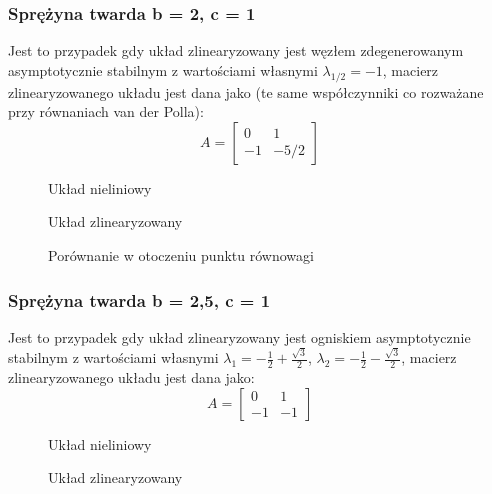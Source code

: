 \documentclass[a4paper, 10pt]{article}
\begin{document}
			\subsubsection{Sprężyna twarda b = 2, c = 1}
				Jest to przypadek gdy układ zlinearyzowany jest węzłem zdegenerowanym asymptotycznie stabilnym z wartościami własnymi $\lambda_{1/2} =-1$, macierz zlinearyzowanego układu jest dana jako (te same współczynniki co rozważane przy równaniach van der Polla):
				$$
				A = \begin{bmatrix}
				0 & 1 \\
				-1  & -5/2
				\end{bmatrix}
				$$
				\begin{figure}[H]
					\centering
					\def \svgwidth{0.8\columnwidth}
					
					\caption{Układ nieliniowy}
				\end{figure}\noindent
				
				
				\begin{figure}[H]
					\centering
					\def \svgwidth{0.8\columnwidth}
					
					\caption{Układ zlinearyzowany}
				\end{figure}\noindent
				
				
				\begin{figure}[H]
					\centering
					\def \svgwidth{0.8\columnwidth}
					
					\caption{Porównanie w otoczeniu punktu równowagi}
				\end{figure}\noindent
				
			\subsubsection{Sprężyna twarda b = 2,5, c = 1}
				Jest to przypadek gdy układ zlinearyzowany jest ogniskiem asymptotycznie stabilnym z wartościami własnymi $\lambda_1 = -\frac{1}{2} + \frac{\sqrt{3}}{2}$, $\lambda_2 = -\frac{1}{2} - \frac{\sqrt{3}}{2}$, macierz zlinearyzowanego układu jest dana jako:
				$$
				A = \begin{bmatrix}
				0 & 1 \\
				-1  & -1
				\end{bmatrix}
				$$
				\begin{figure}[H]
					\centering
					\def \svgwidth{0.8\columnwidth}
					
					\caption{Układ nieliniowy}
				\end{figure}\noindent
				
				
				\begin{figure}[H]
					\centering
					\def \svgwidth{0.8\columnwidth}
					
					\caption{Układ zlinearyzowany}
				\end{figure}\noindent
				
\end{document}
